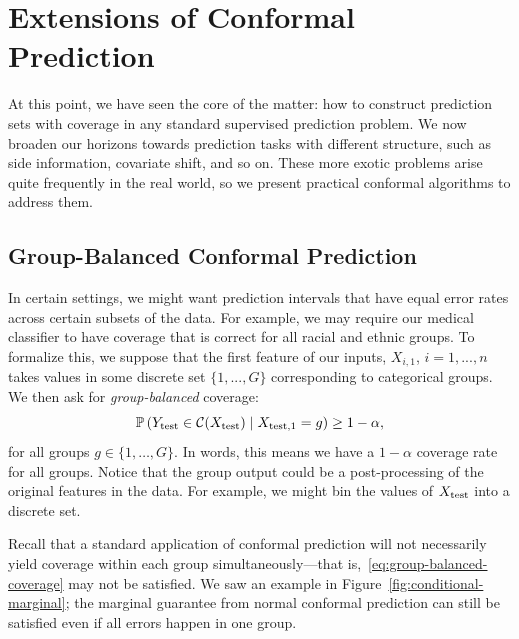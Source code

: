 \documentclass[10pt]{article}
\newcommand{\C}{\mathcal{C}}
\renewcommand{\P}{\mathbb{P}}
\begin{document}
\section{Extensions of Conformal Prediction}
\label{sec:advanced}

At this point, we have seen the core of the matter: how to construct prediction sets with coverage in any standard supervised prediction problem.
We now broaden our horizons towards prediction tasks with different structure, such as side information, covariate shift, and so on.
These more exotic problems arise quite frequently in the real world, so we present practical conformal algorithms to address them.

\subsection{Group-Balanced Conformal Prediction}
\label{sec:group-balanced}

In certain settings, we might want prediction intervals that have equal error rates across certain subsets of the data. 
For example, we may require our medical classifier to have coverage that is correct for all racial and ethnic groups. 
To formalize this, we suppose that the first feature of our inputs, $X_{i,1}$, $i = 1, ..., n$ takes values in some discrete set $\{1,...,G\}$ corresponding to categorical groups.
We then ask for \emph{group-balanced} coverage:
\begin{equation}
    \label{eq:group-balanced-coverage}
    \P\left( Y_{\rm test} \in \C(X_{\rm test}) \; \rvert \; X_{\rm test,1} = g \right) \ge 1-\alpha,
\end{equation}
for all groups $g \in \{1,\dots,G\}$.
In words, this means we have a $1-\alpha$ coverage rate for all groups.
Notice that the group output could be a post-processing of the original features in the data.
For example, we might bin the values of $X_{\rm test}$ into a discrete set.

Recall that a standard application of conformal prediction will not necessarily yield coverage within each group simultaneously---that is,~\eqref{eq:group-balanced-coverage} may not be satisfied.
We saw an example in Figure~\ref{fig:conditional-marginal}; the marginal guarantee from normal conformal prediction can still be satisfied even if all errors happen in one group.
\end{document}
